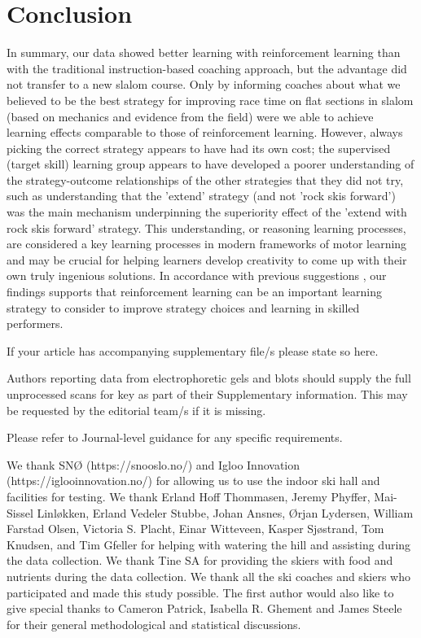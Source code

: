 \documentclass[pdflatex,sn-nature]{sn-jnl}%
\theoremstyle{thmstyleone}%
\theoremstyle{thmstyletwo}%
\theoremstyle{thmstylethree}%
\begin{document}
\section{Conclusion}
In summary, our data showed better learning with reinforcement learning than with the traditional instruction-based coaching approach, but the advantage did not transfer to a new slalom course. Only by informing coaches about what we believed to be the best strategy for improving race time on flat sections in slalom (based on mechanics and evidence from the field) were we able to achieve learning effects comparable to those of reinforcement learning. However, always picking the correct strategy appears to have had its own cost; the supervised (target skill) learning group appears to have developed a poorer understanding of the strategy-outcome relationships of the other strategies that they did not try, such as understanding that the 'extend' strategy (and not 'rock skis forward') was the main mechanism underpinning the superiority effect of the 'extend with rock skis forward' strategy. This understanding, or reasoning learning processes, are considered a key learning processes in modern frameworks of motor learning \cite{tsay_strategy_2023} and may be crucial for helping learners develop creativity to come up with their own truly ingenious solutions\cite{ericsson_scientific_1998}. In accordance with previous suggestions \cite{lohse_errors_2019, yarrow_inside_2009}, our findings supports that reinforcement learning can be an important learning strategy to consider to improve strategy choices and learning in skilled performers.



\backmatter


If your article has accompanying supplementary file/s please state so here. 

Authors reporting data from electrophoretic gels and blots should supply the full unprocessed scans for key as part of their Supplementary information. This may be requested by the editorial team/s if it is missing.

Please refer to Journal-level guidance for any specific requirements.

We thank SNØ (https://snooslo.no/) and Igloo Innovation (https://iglooinnovation.no/) for allowing us to use the indoor ski hall and facilities for testing. We thank Erland Hoff Thommasen, Jeremy Phyffer, Mai-Sissel Linløkken, Erland Vedeler Stubbe, Johan Ansnes, Ørjan Lydersen, William Farstad Olsen, Victoria S. Placht, Einar Witteveen, Kasper Sjøstrand, Tom Knudsen, and Tim Gfeller for helping with watering the hill and assisting during the data collection. We thank Tine SA for providing the skiers with food and nutrients during the data collection. We thank all the ski coaches and skiers who participated and made this study possible. The first author would also like to give special thanks to Cameron Patrick, Isabella R. Ghement and James Steele for their general methodological and statistical discussions.
\end{document}
